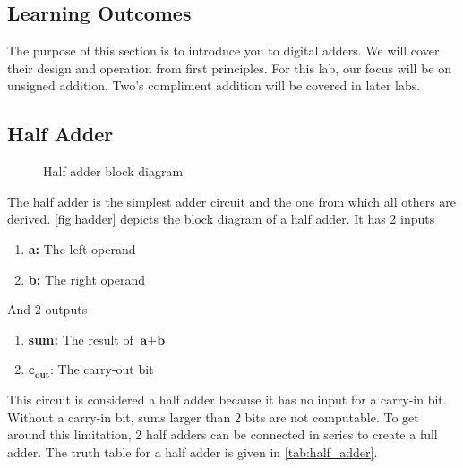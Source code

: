 \documentclass[12pt]{betterjournal}
\begin{document}
\subsection{Learning Outcomes}
The purpose of this section is to introduce you to digital adders. We will cover their design and operation from first principles. For this lab, our focus will be on unsigned addition. Two's compliment addition will be covered in later labs.

\subsection{Half Adder}
\begin{figure}
    \centering
{}
    \caption{Half adder block diagram}
    \label{fig:hadder}
\end{figure}%

The half adder is the simplest adder circuit and the one from which all others are derived. \autoref{fig:hadder} depicts the block diagram of a half adder. It has 2 inputs
\begin{enumerate}
    \item \textbf{a:} The left operand
    \item \textbf{b:} The right operand
\end{enumerate}
\clearpage
And 2 outputs
\begin{enumerate}
    \item \textbf{sum:} The result of $\textbf{a} + \textbf{b}$
    \item $\textbf{c}_\textbf{out}$: The carry-out bit
\end{enumerate}%
{\setlength{\linewidth}{\textwidth}
\noindent
This circuit is considered a half adder because it has no input for a carry-in bit. Without a carry-in bit, sums larger than 2 bits are not computable. To get around this limitation, 2 half adders can be connected in series to create a full adder. The truth table for a half adder is given in \autoref{tab:half_adder}.}
\end{document}
